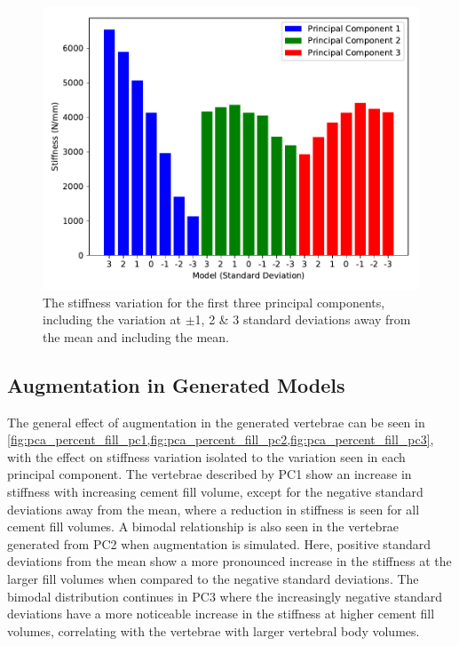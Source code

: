 \begin{figure}[h]
  \centering
  \includegraphics[width=.9\textwidth]{Chapters/Chapter_PCA_images/pca_stiff.pdf}
  \caption{The stiffness variation for the first three principal components, including the variation at $\pm$1, 2 \& 3 standard deviations away from the mean and including the mean.}
  \label{fig:pca_stiff}
\end{figure}

\subsection{Augmentation in Generated Models}


The general effect of augmentation in the generated vertebrae can be seen in \cref{fig:pca_percent_fill_pc1,fig:pca_percent_fill_pc2,fig:pca_percent_fill_pc3}, with the effect on stiffness variation isolated to the variation seen in each principal component.
The vertebrae described by PC1 show an increase in stiffness with increasing cement fill volume, except for the negative standard deviations away from the mean, where a reduction in stiffness is seen for all cement fill volumes.
A bimodal relationship is also seen in the vertebrae generated from PC2 when augmentation is simulated.
Here, positive standard deviations from the mean show a more pronounced increase in the stiffness at the larger fill volumes when compared to the negative standard deviations.
The bimodal distribution continues in PC3 where the increasingly negative standard deviations have a more noticeable increase in the stiffness at higher cement fill volumes, correlating with the vertebrae with larger vertebral body volumes.

